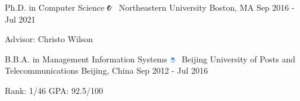 \documentclass[letterpaper]{awesome-cv}
\begin{document}
\makecvheader

\addvspace{4ex}
\begin{cventries}
  \cventry
    {Ph.D. in Computer Science}
    {\includegraphics[width=0.016\textwidth]{../images/logos/northeastern.png}~ Northeastern University}
    {Boston, MA}
    {Sep 2016 - Jul 2021}
    {
      \begin{cvitems}
        \item {Advisor: Christo Wilson}
      \end{cvitems}
    }
  \cventry
    {B.B.A. in Management Information Systems}
    {\includegraphics[width=0.016\textwidth]{../images/logos/bupt.png}~ Beijing University of Posts and Telecommunications}
    {Beijing, China}
    {Sep 2012 - Jul 2016}
    {
      \begin{cvitems}
        \item {Rank: 1/46 \hspace{0.5ex} GPA: 92.5/100}
      \end{cvitems}
    }
\end{cventries}
\end{document}
